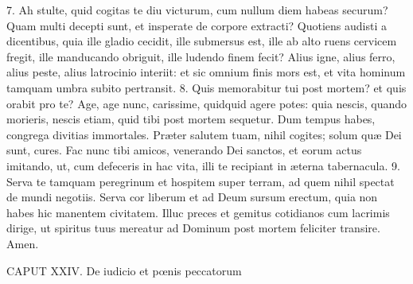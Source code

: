\documentclass[twoside]{article}
\begin{document}
7. Ah stulte, quid cogitas te diu victurum, cum nullum diem habeas securum? Quam multi decepti sunt, et insperate de corpore extracti? Quotiens audisti a dicentibus, quia ille gladio cecidit, ille submersus est, ille ab alto ruens cervicem fregit, ille manducando obriguit, ille ludendo finem fecit? Alius igne, alius ferro, alius peste, alius latrocinio interiit: et sic omnium finis mors est, et vita hominum tamquam umbra subito pertransit.
8. Quis memorabitur tui post mortem? et quis orabit pro te? Age, age nunc, carissime, quidquid agere potes: quia nescis, quando morieris, nescis etiam, quid tibi post mortem sequetur. Dum tempus habes, congrega divitias immortales. Præter salutem tuam, nihil cogites; solum quæ Dei sunt, cures. Fac nunc tibi amicos, venerando Dei sanctos, et eorum actus imitando, ut, cum defeceris in hac vita, illi te recipiant in æterna tabernacula.
9. Serva te tamquam peregrinum et hospitem super terram, ad quem nihil spectat de mundi negotiis. Serva cor liberum et ad Deum sursum erectum, quia non habes hic manentem civitatem. Illuc preces et gemitus cotidianos cum lacrimis dirige, ut spiritus tuus mereatur ad Dominum post mortem feliciter transire. Amen.


CAPUT XXIV.
De iudicio et pœnis peccatorum
\end{document}
